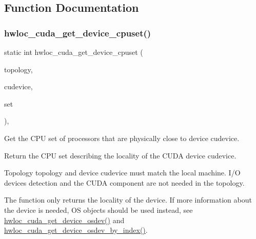\subsection{Function Documentation}
\mbox{\label{a00219_gaec41c6b4dc3361156beb7dea2a74f5a3}} 
\subsubsection{\texorpdfstring{hwloc\+\_\+cuda\+\_\+get\+\_\+device\+\_\+cpuset()}{hwloc\_cuda\_get\_device\_cpuset()}}
{\footnotesize\ttfamily static int hwloc\+\_\+cuda\+\_\+get\+\_\+device\+\_\+cpuset (\begin{DoxyParamCaption}\item[{\hyperlink{a00186_ga9d1e76ee15a7dee158b786c30b6a6e38}{hwloc\+\_\+topology\+\_\+t}}]{topology,  }\item[{C\+Udevice}]{cudevice,  }\item[{\hyperlink{a00183_ga4bbf39b68b6f568fb92739e7c0ea7801}{hwloc\+\_\+cpuset\+\_\+t}}]{set }\end{DoxyParamCaption})\hspace{0.3cm}{\ttfamily [inline]}, {\ttfamily [static]}}



Get the C\+PU set of processors that are physically close to device {\ttfamily cudevice}. 

Return the C\+PU set describing the locality of the C\+U\+DA device {\ttfamily cudevice}.

Topology {\ttfamily topology} and device {\ttfamily cudevice} must match the local machine. I/O devices detection and the C\+U\+DA component are not needed in the topology.

The function only returns the locality of the device. If more information about the device is needed, OS objects should be used instead, see \hyperlink{a00219_ga252cb72175f1a2d682f883a0add80a66}{hwloc\+\_\+cuda\+\_\+get\+\_\+device\+\_\+osdev()} and \hyperlink{a00219_ga12ee892994ed037e8f64bbffda02cf2e}{hwloc\+\_\+cuda\+\_\+get\+\_\+device\+\_\+osdev\+\_\+by\+\_\+index()}.

